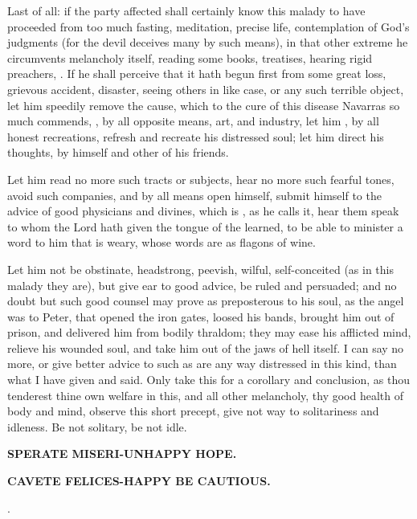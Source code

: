 {Last of all: if the party affected shall certainly know this malady to
have proceeded from too much fasting, meditation, precise life,
contemplation of God's judgments (for the devil deceives many by such
means), in that other extreme he circumvents melancholy itself, reading
some books, treatises, hearing rigid preachers, \etc{}. If he shall
perceive that it hath begun first from some great loss, grievous
accident, disaster, seeing others in like case, or any such terrible
object, let him speedily remove the cause, which to the cure of this
disease Navarras so much commends, , by all opposite means, art, and industry, let him , by all honest recreations, refresh and recreate his distressed
soul; let him direct his thoughts, by himself and other of his friends.

Let him read no more such tracts or subjects, hear no more such fearful
tones, avoid such companies, and by all means open himself, submit
himself to the advice of good physicians and divines, which is
, as he calls it, hear them speak to whom
the Lord hath given the tongue of the learned, to be able to minister a
word to him that is weary, whose words are as flagons of wine.

Let him not be obstinate, headstrong, peevish, wilful, self-conceited
(as in this malady they are), but give ear to good advice, be ruled and
persuaded; and no doubt but such good counsel may prove as preposterous
to his soul, as the angel was to Peter, that opened the iron gates,
loosed his bands, brought him out of prison, and delivered him from
bodily thraldom; they may ease his afflicted mind, relieve his wounded
soul, and take him out of the jaws of hell itself. I can say no more,
or give better advice to such as are any way distressed in this kind,
than what I have given and said. Only take this for a corollary and
conclusion, as thou tenderest thine own welfare in this, and all other
melancholy, thy good health of body and mind, observe this short
precept, give not way to solitariness and idleness. Be not solitary, be
not idle.

\textbf{\textlatin{SPERATE MISERI}-UNHAPPY HOPE.}

\textbf{\textlatin{CAVETE FELICES}-HAPPY BE CAUTIOUS.}

 \Austin{}.
}
